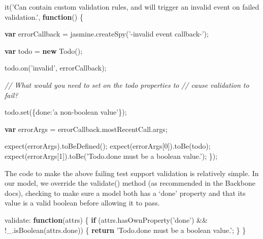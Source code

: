 \documentclass[9pt]{book}
\newenvironment{Shaded}{}{}
\newcommand{\KeywordTok}[1]{\textcolor[rgb]{0.00,0.44,0.13}{\textbf{{#1}}}}
\newcommand{\DataTypeTok}[1]{\textcolor[rgb]{0.56,0.13,0.00}{{#1}}}
\newcommand{\DecValTok}[1]{\textcolor[rgb]{0.25,0.63,0.44}{{#1}}}
\newcommand{\StringTok}[1]{\textcolor[rgb]{0.25,0.44,0.63}{{#1}}}
\newcommand{\CommentTok}[1]{\textcolor[rgb]{0.38,0.63,0.69}{\textit{{#1}}}}
\newcommand{\OtherTok}[1]{\textcolor[rgb]{0.00,0.44,0.13}{{#1}}}
\newcommand{\FunctionTok}[1]{\textcolor[rgb]{0.02,0.16,0.49}{{#1}}}
\newcommand{\NormalTok}[1]{{#1}}
\begin{document}
\begin{Shaded}
\begin{Highlighting}[]
\FunctionTok{it}\NormalTok{(}\StringTok{'Can contain custom validation rules, and will trigger an invalid event on failed validation.'}\NormalTok{, }\KeywordTok{function}\NormalTok{() \{}

    \KeywordTok{var} \NormalTok{errorCallback = }\OtherTok{jasmine}\NormalTok{.}\FunctionTok{createSpy}\NormalTok{(}\StringTok{'-invalid event callback-'}\NormalTok{);}

    \KeywordTok{var} \NormalTok{todo = }\KeywordTok{new} \FunctionTok{Todo}\NormalTok{();}

    \OtherTok{todo}\NormalTok{.}\FunctionTok{on}\NormalTok{(}\StringTok{'invalid'}\NormalTok{, errorCallback);}

    \CommentTok{// What would you need to set on the todo properties to}
    \CommentTok{// cause validation to fail?}

    \OtherTok{todo}\NormalTok{.}\FunctionTok{set}\NormalTok{(\{}\DataTypeTok{done}\NormalTok{:}\StringTok{'a non-boolean value'}\NormalTok{\});}

    \KeywordTok{var} \NormalTok{errorArgs = }\OtherTok{errorCallback}\NormalTok{.}\OtherTok{mostRecentCall}\NormalTok{.}\FunctionTok{args}\NormalTok{;}

    \FunctionTok{expect}\NormalTok{(errorArgs).}\FunctionTok{toBeDefined}\NormalTok{();}
    \FunctionTok{expect}\NormalTok{(errorArgs[}\DecValTok{0}\NormalTok{]).}\FunctionTok{toBe}\NormalTok{(todo);}
    \FunctionTok{expect}\NormalTok{(errorArgs[}\DecValTok{1}\NormalTok{]).}\FunctionTok{toBe}\NormalTok{(}\StringTok{'Todo.done must be a boolean value.'}\NormalTok{);}
\NormalTok{\});}
\end{Highlighting}
\end{Shaded}

The code to make the above failing test support validation is relatively
simple. In our model, we override the validate() method (as recommended
in the Backbone docs), checking to make sure a model both has a `done'
property and that its value is a valid boolean before allowing it to
pass.

\begin{Shaded}
\begin{Highlighting}[]
\NormalTok{validate: }\KeywordTok{function}\NormalTok{(attrs) \{}
    \KeywordTok{if} \NormalTok{(}\OtherTok{attrs}\NormalTok{.}\FunctionTok{hasOwnProperty}\NormalTok{(}\StringTok{'done'}\NormalTok{) && !}\OtherTok{_}\NormalTok{.}\FunctionTok{isBoolean}\NormalTok{(}\OtherTok{attrs}\NormalTok{.}\FunctionTok{done}\NormalTok{)) \{}
        \KeywordTok{return} \StringTok{'Todo.done must be a boolean value.'}\NormalTok{;}
    \NormalTok{\}}
\NormalTok{\}}
\end{Highlighting}
\end{Shaded}
\end{document}
